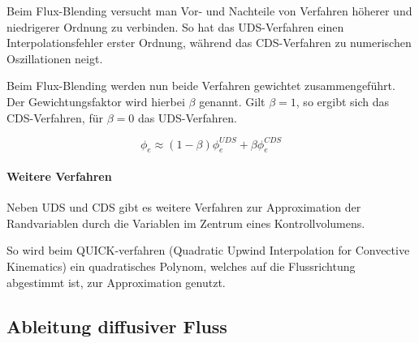 Beim Flux-Blending versucht man Vor- und Nachteile von Verfahren höherer und niedrigerer
Ordnung zu verbinden. So hat das UDS-Verfahren einen Interpolationsfehler erster Ordnung,
während das CDS-Verfahren zu numerischen Oszillationen neigt.

Beim Flux-Blending werden nun beide Verfahren gewichtet zusammengeführt. Der Gewichtungsfaktor
wird hierbei $\beta$ genannt. Gilt $\beta = 1$, so ergibt sich das CDS-Verfahren, für
$\beta = 0$ das UDS-Verfahren.

\begin{equation}
  \phi_e \approx (1-\beta)\phi_e^{UDS} + \beta \phi_e^{CDS}
  \label{eq:flux_blending}
\end{equation}



\paragraph{Weitere Verfahren}
Neben UDS und CDS gibt es weitere Verfahren zur Approximation der Randvariablen durch
die Variablen im Zentrum eines Kontrollvolumens.

So wird beim QUICK-verfahren (Quadratic Upwind Interpolation for Convective
Kinematics) ein quadratisches Polynom, welches auf die Flussrichtung abgestimmt ist,
zur Approximation genutzt.



\subsection{Ableitung diffusiver Fluss}
